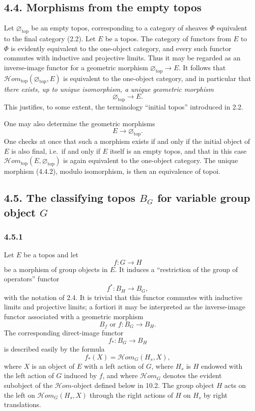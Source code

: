 \documentclass[11pt]{article}
\newcommand{\Hhom}{\mathcal{H}om}
\newcommand{\Hhomtop}{\mathcal{H}om_{\mathrm{top}}}
\newcommand{\ie}{i.e.}
\begin{document}
\subsection*{4.4. Morphisms from the empty topos}
Let \(\varnothing_{\mathrm{top}}\) be an empty topos, corresponding to a category of sheaves \(\Phi\) equivalent to the final category (2.2). Let \(E\) be a topos. The category of functors from \(E\) to \(\Phi\) is evidently equivalent to the one-object category, and every such functor commutes with inductive and projective limits. Thus it may be regarded as an inverse-image functor for a geometric morphism \(\varnothing_{\mathrm{top}}\to E\). It follows that \(\Hhomtop(\varnothing_{\mathrm{top}},E)\) is equivalent to the one-object category, and in particular that \emph{there exists, up to unique isomorphism, a unique geometric morphism}
\[
\varnothing_{\mathrm{top}}\longrightarrow E.\tag{4.4.1}
\]
This justifies, to some extent, the terminology ``initial topos'' introduced in 2.2.

One may also determine the geometric morphisms
\[
E\longrightarrow \varnothing_{\mathrm{top}}.\tag{4.4.2}
\]
One checks at once that such a morphism exists if and only if the initial object of \(E\) is also final, \ie\ if and only if \(E\) itself is an empty topos, and that in this case \(\Hhomtop(E,\varnothing_{\mathrm{top}})\) is again equivalent to the one-object category. The unique morphism (4.4.2), modulo isomorphism, is then an equivalence of topoi.

\subsection*{4.5. The classifying topos \(B_G\) for variable group object \(G\)}

\subsubsection*{4.5.1}
Let \(E\) be a topos and let
\[
f:G\longrightarrow H
\]
be a morphism of group objects in \(E\). It induces a ``restriction of the group of operators'' functor
\[
f^\ast:B_H\longrightarrow B_G,
\]
with the notation of 2.4. It is trivial that this functor commutes with inductive limits and projective limits; a fortiori it may be interpreted as the inverse-image functor associated with a geometric morphism
\[
B_f\text{ or }f:B_G\longrightarrow B_H.
\]
The corresponding direct-image functor
\[
f_\ast:B_G\longrightarrow B_H
\]
is described easily by the formula
\[
f_\ast(X)=\Hhom_G(H_s,X),
\]
where \(X\) is an object of \(E\) with a left action of \(G\), where \(H_s\) is \(H\) endowed with the left action of \(G\) induced by \(f\), and where \(\Hhom_G\) denotes the evident subobject of the \(\mathcal Hom\)-object defined below in 10.2. The group object \(H\) acts on the left on \(\Hhom_G(H_s,X)\) through the right actions of \(H\) on \(H_s\) by right translations.
\end{document}
